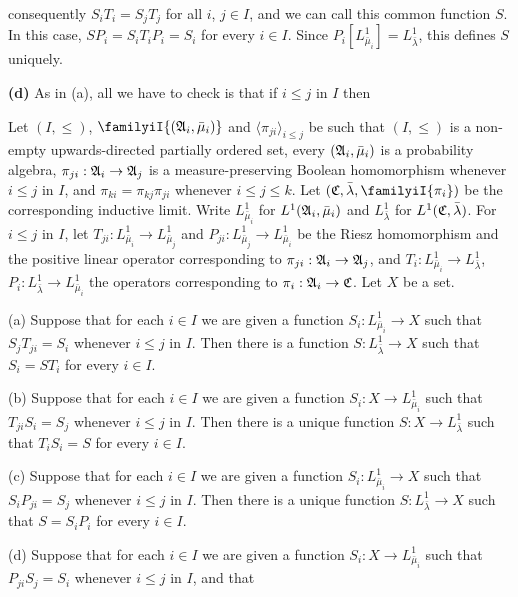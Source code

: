 
\noindent consequently $S_iT_i=S_jT_j$ for all $i$, $j\in I$, and we can
call this common function $S$.   In this case, $SP_i=S_iT_iP_i=S_i$ for
every $i\in I$.   Since $P_i[L^1_{\bar\mu_i}]=L^1_{\bar\lambda}$,
this defines $S$ uniquely.

\medskip

{\bf (d)} As in (a), all we have to check is that if $i\le j$ in $I$ then

\else\fi%

Let $(I,\le)$, $\familyiI{(\frak A_i,\bar\mu_i)}$ and
$\langle\pi_{ji}\rangle_{i\le j}$ be such that $(I,\le)$ is a non-empty
upwards-directed partially ordered
set, every $(\frak A_i,\bar\mu_i)$ is a probability
algebra, $\pi_{ji}:\frak A_i\to\frak A_j$ is a measure-preserving
Boolean homomorphism whenever $i\le j$ in $I$, and
$\pi_{ki}=\pi_{kj}\pi_{ji}$ whenever $i\le j\le k$.   Let
$(\frak C,\bar\lambda,\familyiI{\pi_i})$ be the corresponding inductive
limit.   Write $L^1_{\bar\mu_i}$ for
$L^1(\frak A_i,\bar\mu_i)$ and $L^1_{\bar\lambda}$ for
$L^1(\frak C,\bar\lambda)$.   For $i\le j$ in $I$, let
$T_{ji}:L^1_{\bar\mu_i}\to L^1_{\bar\mu_j}$ and
$P_{ji}:L^1_{\bar\mu_j}\to L^1_{\bar\mu_i}$ be the Riesz homomorphism
and the positive linear operator corresponding to
$\pi_{ji}:\frak A_i\to\frak A_j$, and
$T_i:L^1_{\bar\mu_i}\to L^1_{\bar\lambda}$,
$P_i:L^1_{\bar\lambda}\to L^1_{\bar\mu_i}$ the operators corresponding to
$\pi_i:\frak A_i\to\frak C$.   Let $X$ be a set.

(a) Suppose that for each $i\in I$ we are given a function
$S_i:L^1_{\bar\mu_i}\to X$ such that
$S_jT_{ji}=S_i$ whenever $i\le j$
in $I$.   Then there is a
function $S:L^1_{\bar\lambda}\to X$ such
that $S_i=ST_i$ for every $i\in I$.

(b) Suppose that for each $i\in I$ we are given a function
$S_i:X\to L^1_{\bar\mu_i}$ such that $T_{ji}S_i=S_j$ whenever $i\le j$
in $I$.   Then there is a unique function $S:X\to L^1_{\bar\lambda}$ such
that $T_iS_i=S$ for every $i\in I$.

(c) Suppose that for each $i\in I$ we are given a function
$S_i:L^1_{\bar\mu_i}\to X$ such that
$S_iP_{ji}=S_j$ whenever $i\le j$ in $I$.   Then there is a unique
function $S:L^1_{\bar\lambda}\to X$ such
that $S=S_iP_i$ for every $i\in I$.

(d) Suppose that for each $i\in I$ we are given a function
$S_i:X\to L^1_{\bar\mu_i}$ such that $P_{ji}S_j=S_i$ whenever $i\le j$ in
$I$, and that

